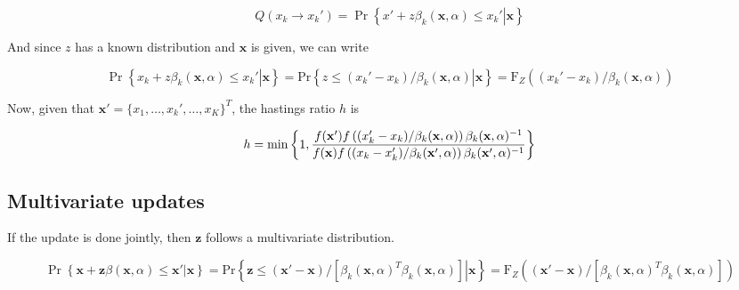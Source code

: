 \documentclass{article}
\begin{document}
$$
Q(x_k\to x_k')= \Pr\left\{\left.x' + z\beta_k(\mathbf{x},\alpha)\leq x_k'\right|\mathbf{x}\right\}
$$


And since $z$ has a known distribution and $\mathbf{x}$ is given, we can write

$$
\Pr\left\{\left.x_k + z\beta_k(\mathbf{x},\alpha)\leq x_k'\right|\mathbf{x}\right\} =
\mbox{Pr}\left\{\left.z\leq (x_k' - x_k)/\beta_k(\mathbf{x},\alpha)\right|\mathbf{x}\right\} =
\mbox{F}_Z\left((x_k' - x_k)/\beta_k(\mathbf{x},\alpha)\right)
$$

Now, given that $\mathbf{x}' = \{x_1,\dots, x_k', \dots, x_K\}^T$, the hastings ratio $h$ is

\begin{equation}
h = \min\left\{1,\frac{f(\mathbf{x}') f\left((x_k' - x_k)/\beta_k(\mathbf{x},\alpha)\right)\beta_k(\mathbf{x},\alpha)^{-1}}{%
f(\mathbf{x}) f\left((x_k - x_k')/\beta_k(\mathbf{x'},\alpha)\right)\beta_k(\mathbf{x}',\alpha)^{-1}}\right\}
\end{equation}

\subsection{Multivariate updates}

If the update is done jointly, then $\mathbf{z}$ follows a multivariate distribution.

$$
\Pr\left\{\left.\mathbf{x} + \mathbf{z}\beta(\mathbf{x},\alpha)\leq \mathbf{x}'\right|\mathbf{x}\right\} =
\mbox{Pr}\left\{\left.\mathbf{z}\leq (\mathbf{x}' - \mathbf{x})/\left[\beta_k(\mathbf{x},\alpha)^T\beta_k(\mathbf{x},\alpha)\right]\right|\mathbf{x}\right\} =
\mbox{F}_Z\left((\mathbf{x}' - \mathbf{x})/\left[\beta_k(\mathbf{x},\alpha)^T\beta_k(\mathbf{x},\alpha)\right]\right)
$$
\end{document}
